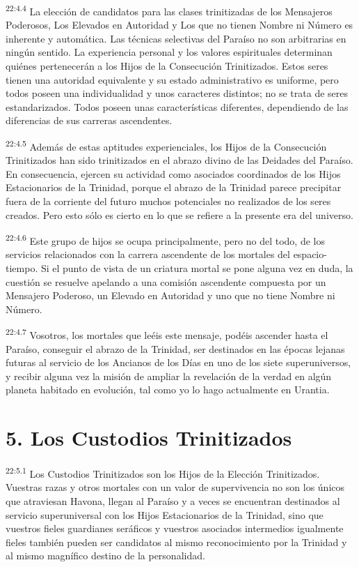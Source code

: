 \par
\textsuperscript{22:4.4} La elección de candidatos para las clases trinitizadas de los Mensajeros Poderosos, Los Elevados en Autoridad y Los que no tienen Nombre ni Número es inherente y automática. Las técnicas selectivas del Paraíso no son arbitrarias en ningún sentido. La experiencia personal y los valores espirituales determinan quiénes pertenecerán a los Hijos de la Consecución Trinitizados. Estos seres tienen una autoridad equivalente y su estado administrativo es uniforme, pero todos poseen una individualidad y unos caracteres distintos; no se trata de seres estandarizados. Todos poseen unas características diferentes, dependiendo de las diferencias de sus carreras ascendentes.

\par
\textsuperscript{22:4.5} Además de estas aptitudes experienciales, los Hijos de la Consecución Trinitizados han sido trinitizados en el abrazo divino de las Deidades del Paraíso. En consecuencia, ejercen su actividad como asociados coordinados de los Hijos Estacionarios de la Trinidad, porque el abrazo de la Trinidad parece precipitar fuera de la corriente del futuro muchos potenciales no realizados de los seres creados. Pero esto sólo es cierto en lo que se refiere a la presente era del universo.

\par
\textsuperscript{22:4.6} Este grupo de hijos se ocupa principalmente, pero no del todo, de los servicios relacionados con la carrera ascendente de los mortales del espacio-tiempo. Si el punto de vista de un criatura mortal se pone alguna vez en duda, la cuestión se resuelve apelando a una comisión ascendente compuesta por un Mensajero Poderoso, un Elevado en Autoridad y uno que no tiene Nombre ni Número.

\par
\textsuperscript{22:4.7} Vosotros, los mortales que leéis este mensaje, podéis ascender hasta el Paraíso, conseguir el abrazo de la Trinidad, ser destinados en las épocas lejanas futuras al servicio de los Ancianos de los Días en uno de los siete superuniversos, y recibir alguna vez la misión de ampliar la revelación de la verdad en algún planeta habitado en evolución, tal como yo lo hago actualmente en Urantia.

\section*{5. Los Custodios Trinitizados}
\par
\textsuperscript{22:5.1} Los Custodios Trinitizados son los Hijos de la Elección Trinitizados. Vuestras razas y otros mortales con un valor de supervivencia no son los únicos que atraviesan Havona, llegan al Paraíso y a veces se encuentran destinados al servicio superuniversal con los Hijos Estacionarios de la Trinidad, sino que vuestros fieles guardianes seráficos y vuestros asociados intermedios igualmente fieles también pueden ser candidatos al mismo reconocimiento por la Trinidad y al mismo magnífico destino de la personalidad.

